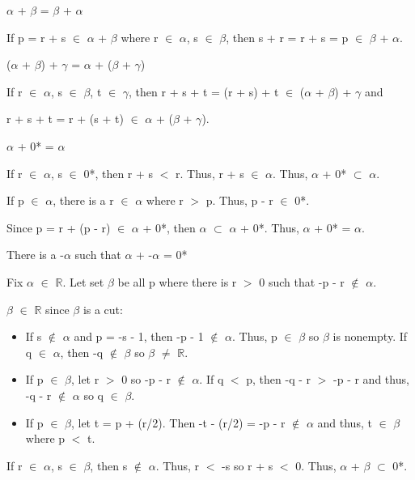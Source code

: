 \begin{adjustbox}{minipage=14cm, right, vspace=0.1cm 0cm}
		$\alpha$ + $\beta$ = $\beta$ + $\alpha$

			\qquad If p = r + s $\in$ $\alpha$ + $\beta$ where
			r $\in$ $\alpha$, s $\in$ $\beta$, then s + r = r + s = p $\in$ $\beta$ + $\alpha$.

		($\alpha$ + $\beta$) + $\gamma$  = $\alpha$ + ($\beta$ + $\gamma$)

			\qquad If r $\in$ $\alpha$, s $\in$ $\beta$, t $\in$ $\gamma$, then
			r + s + t = (r + s) + t $\in$ ($\alpha$ + $\beta$) + $\gamma$ and

			\qquad r + s + t = r + (s + t) $\in$ $\alpha$ + ($\beta$ + $\gamma$).

		$\alpha$ + 0* = $\alpha$

			\qquad If r $\in$ $\alpha$, s $\in$ 0*, then r + s $<$ r. Thus, r + s $\in$ $\alpha$.
			Thus, $\alpha$ + 0* $\subset$ $\alpha$.

			\qquad If p $\in$ $\alpha$, there is a r $\in$ $\alpha$ where r $>$ p.
			Thus, p - r $\in$ 0*.

			\qquad Since p = r + (p - r) $\in$ $\alpha$ + 0*, then $\alpha$ $\subset$ $\alpha$ + 0*.
			Thus, $\alpha$ + 0* = $\alpha$.

		There is a -$\alpha$ such that $\alpha$ + -$\alpha$ = 0*

			\qquad Fix $\alpha$ $\in$ $\mathbb{R}$. Let set $\beta$ be all p where
			there is r $>$ 0 such that -p - r $\not \in$ $\alpha$.

			\qquad $\beta$ $\in$ $\mathbb{R}$ since $\beta$ is a cut:

			\begin{itemize}[leftmargin=2cm, itemsep=0.1cm]
				\item If s $\not \in$ $\alpha$ and p = -s - 1, then -p - 1 $\not \in$ $\alpha$.
					Thus, p $\in$ $\beta$ so $\beta$ is nonempty.
					If q $\in$ $\alpha$, then -q $\not \in$ $\beta$ so $\beta$ $\neq$ $\mathbb{R}$.

				\item If p $\in$ $\beta$, let r $>$ 0 so -p - r $\not \in$ $\alpha$.
					If q $<$ p, then -q - r $>$ -p - r and thus, -q - r $\not \in$ $\alpha$
					so q $\in$ $\beta$.

				\item If p $\in$ $\beta$, let t = p + (r/2). Then
					-t - (r/2) = -p - r $\not \in$ $\alpha$ and thus, t $\in$ $\beta$
					where p $<$ t.
			\end{itemize}
			
			\qquad If r $\in$ $\alpha$, s $\in$ $\beta$, then s $\not \in$ $\alpha$. Thus,
			r $<$ -s so r + s $<$ 0. Thus, $\alpha$ + $\beta$ $\subset$ 0*.


\end{adjustbox}
